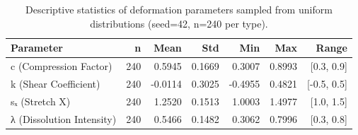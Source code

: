 \begin{table}[htbp]
\caption{Descriptive statistics of deformation parameters sampled from uniform distributions (seed=42, n=240 per type).}
\label{tab:parameter_stats}
\begin{tabular}{lrrrrrr}
\toprule
Parameter & n & Mean & Std & Min & Max & Range \\
\midrule
c (Compression Factor) & 240 & 0.5945 & 0.1669 & 0.3007 & 0.8993 & [0.3, 0.9] \\
k (Shear Coefficient) & 240 & -0.0114 & 0.3025 & -0.4955 & 0.4821 & [-0.5, 0.5] \\
sₓ (Stretch X) & 240 & 1.2520 & 0.1513 & 1.0003 & 1.4977 & [1.0, 1.5] \\
λ (Dissolution Intensity) & 240 & 0.5466 & 0.1482 & 0.3062 & 0.7996 & [0.3, 0.8] \\
\bottomrule
\end{tabular}
\end{table}
